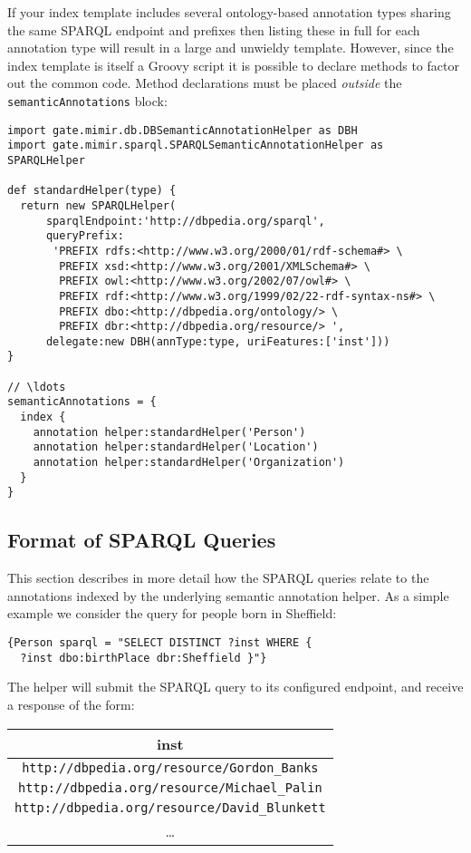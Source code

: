 If your index template includes several ontology-based annotation types sharing
the same SPARQL endpoint and prefixes then listing these in full for each
annotation type will result in a large and unwieldy template.  However, since
the index template is itself a Groovy script it is possible to declare methods
to factor out the common code.  Method declarations must be placed
{\em outside} the {\tt semanticAnnotations} block:
\begin{lstlisting}[texcl, breaklines, breakindent=150pt]
import gate.mimir.db.DBSemanticAnnotationHelper as DBH
import gate.mimir.sparql.SPARQLSemanticAnnotationHelper as SPARQLHelper

def standardHelper(type) {
  return new SPARQLHelper(
      sparqlEndpoint:'http://dbpedia.org/sparql',
      queryPrefix:
       'PREFIX rdfs:<http://www.w3.org/2000/01/rdf-schema#> \
        PREFIX xsd:<http://www.w3.org/2001/XMLSchema#> \
        PREFIX owl:<http://www.w3.org/2002/07/owl#> \
        PREFIX rdf:<http://www.w3.org/1999/02/22-rdf-syntax-ns#> \
        PREFIX dbo:<http://dbpedia.org/ontology/> \
        PREFIX dbr:<http://dbpedia.org/resource/> ',
      delegate:new DBH(annType:type, uriFeatures:['inst']))
}

// \ldots
semanticAnnotations = {
  index {
    annotation helper:standardHelper('Person')
    annotation helper:standardHelper('Location')
    annotation helper:standardHelper('Organization')
  }
}
\end{lstlisting}

\subsection{Format of SPARQL Queries}

This section describes in more detail how the SPARQL queries relate to the
annotations indexed by the underlying semantic annotation helper.  As a simple
example we consider the query for people born in Sheffield:
\begin{verbatim}
{Person sparql = "SELECT DISTINCT ?inst WHERE {
  ?inst dbo:birthPlace dbr:Sheffield }"}
\end{verbatim}
%
The helper will submit the SPARQL query to its configured endpoint, and receive
a response of the form:

\begin{tabular}{|c|}
\hline
{\bf inst} \\
\hline
{\tt http://dbpedia.org/resource/Gordon\_Banks} \\
{\tt http://dbpedia.org/resource/Michael\_Palin} \\
{\tt http://dbpedia.org/resource/David\_Blunkett} \\
\ldots \\
\hline
\end{tabular}

